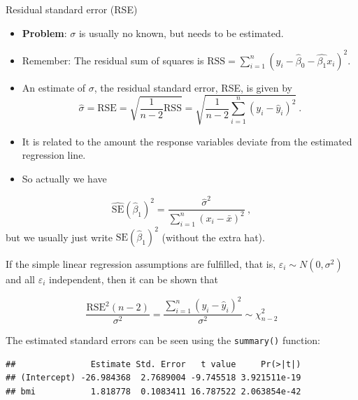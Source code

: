 \documentclass[10pt,ignorenonframetext,]{beamer}
\newenvironment{Shaded}{\begin{snugshade}}{\end{snugshade}}
\newcommand{\KeywordTok}[1]{\textcolor[rgb]{0.13,0.29,0.53}{\textbf{#1}}}
\newcommand{\OperatorTok}[1]{\textcolor[rgb]{0.81,0.36,0.00}{\textbf{#1}}}
\newcommand{\NormalTok}[1]{#1}
\begin{document}
\begin{frame}

\begin{block}{Residual standard error (RSE)}

\vspace{2mm}

\begin{itemize}
\item
  \textbf{Problem}: \(\sigma\) is usually no known, but needs to be
  estimated.
\item
  Remember: The residual sum of squares is
  \(\text{RSS}=\sum_{i=1}^n (y_i-\hat{\beta}_0-\hat{\beta_1}x_{i})^2\).
\item
  An estimate of \(\sigma\), the residual standard error, RSE, is given
  by
  \[\hat\sigma = \text{RSE}  =\sqrt{\frac{1}{n-2} \text{RSS}} = \sqrt{\frac{1}{n-2}\sum_{i=1}^n (y_i -\hat{y}_i)^2} \ .\]
\item
  It is related to the amount the response variables deviate from the
  estimated regression line.
\item
  So actually we have
\end{itemize}

\[\hat{\text{SE}}(\hat{\beta}_1)^2 = \frac{{\hat\sigma}^2}{\sum_{i=1}^n (x_i-\bar{x})^2} \ ,\]
but we usually just write \({\text{SE}}(\hat{\beta}_1)^2\) (without the
extra hat).

\end{block}

\end{frame}

\begin{frame}

If the simple linear regression assumptions are fulfilled, that is,
\(\varepsilon_i\sim N(0,\sigma^2)\) and all \(\varepsilon_i\)
independent, then it can be shown that

\[\frac{\text{RSE}^2(n-2)}{\sigma^2}= \frac{\sum_{i=1}^n (y_i -\hat{y}_i)^2}{\sigma^2}\sim \chi^2_{n-2}\]

\end{frame}

\begin{frame}[fragile]

The estimated standard errors can be seen using the \texttt{summary()}
function:

\small

\begin{Shaded}
\end{Shaded}

\begin{verbatim}
##               Estimate Std. Error   t value     Pr(>|t|)
## (Intercept) -26.984368  2.7689004 -9.745518 3.921511e-19
## bmi           1.818778  0.1083411 16.787522 2.063854e-42
\end{verbatim}

\end{frame}
\end{document}
